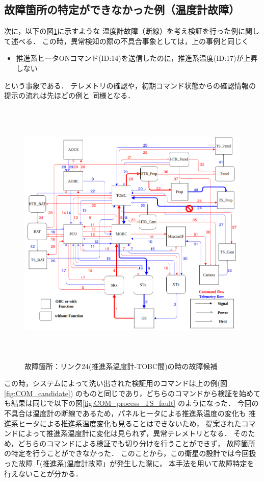 \documentclass[11pt]{jsreport}
\begin{document}
\subsection{故障箇所の特定ができなかった例（温度計故障）}%
次に，以下の図\ref{fig:fault_mode2}に示すような
温度計故障（断線）を考え検証を行った例に関して述べる．
この時，異常検知の際の不具合事象としては，上の事例と同じく
\begin{itemize}
   \item 推進系ヒータONコマンド(ID:14)を送信したのに，推進系温度(ID:17)が上昇しない
\end{itemize}
という事象である．
テレメトリの確認や，初期コマンド状態からの確認情報の提示の流れは先ほどの例と
同様となる．
\begin{figure}[H]
   \centering
      \includegraphics[height=13.0cm]{figure/fault_mode2.png}
      \caption{故障箇所：リンク24(推進系温度計-TOBC間)の時の故障候補}
      \label{fig:fault_mode2}
\end{figure}
この時，システムによって洗い出された検証用のコマンドは上の例(図\ref{fig:COM_candidate})
のものと同じであり，どちらのコマンドから検証を始めても結果は同じで以下の図\ref{fig:COM_process_TS_fault}
のようになった．
今回の不具合は温度計の断線であるため，パネルヒータによる推進系温度の変化も
推進系ヒータによる推進系温度変化も見ることはできないため，
提案されたコマンドによって推進系温度計に変化は見られず，異常テレメトリとなる．
そのため，どちらのコマンドによる検証でも切り分けを行うことができず，
故障箇所の特定を行うことができなかった．
このことから，この衛星の設計では今回扱った故障「(推進系)温度計故障」が発生した際に，
本手法を用いて故障特定を行えないことが分かる．\\
\end{document}

